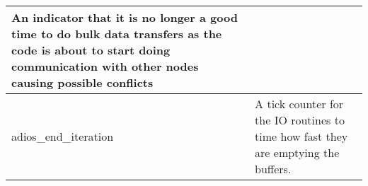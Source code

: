 {\begin{longtable}{llll}
{\begin{minipage}[t]{2.960in}
\linebreak
{\color{color01} An indicator that it is no longer a good time to do bulk data 
transfers as the code is about to start doing communication with other nodes causing 
possible conflicts}\end{minipage}}\\
\hline
\multicolumn{1}{|p{1.540in}|}{\begin{minipage}[t]{1.540in}\raggedright
adios\_end\_iteration\end{minipage}} & \multicolumn{3}{p{2.960in}|}{\begin{minipage}[t]{2.960in}\raggedright
{\color{color01} A tick counter for the IO routines to time how fast they are emptying 
the buffers.}\end{minipage}}
\hspace*{\fill}\end{longtable}\hspace*{\fill}}
